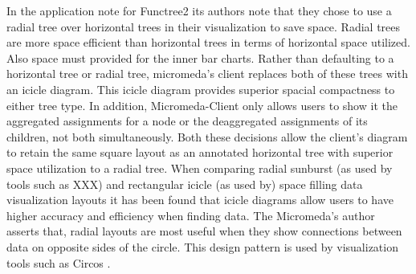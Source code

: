 In the application note for Functree2 its authors note that they chose to use a radial tree over horizontal trees in their visualization to save space. Radial trees are more space efficient than horizontal trees in terms of horizontal space utilized. Also space must provided for the inner bar charts. Rather than defaulting to a horizontal tree or radial tree, micromeda's client replaces both of these trees with an icicle diagram. This icicle diagram provides superior spacial compactness to either tree type. In addition, Micromeda-Client only allows users to show it the aggregated assignments for a node or the deaggregated assignments of its children, not both simultaneously. Both these decisions allow the client's diagram to retain the same square layout as an annotated horizontal tree with superior space utilization to a radial tree. When comparing radial sunburst (as used by tools such as XXX) and rectangular icicle (as used by) space filling data visualization layouts it has been found that icicle diagrams allow users to have higher accuracy and efficiency when finding data. The Micromeda's author asserts that, radial layouts are most useful when they show connections between data on opposite sides of the circle. This design pattern is used by visualization tools such as Circos \cite{krzywinski2009circos}. 